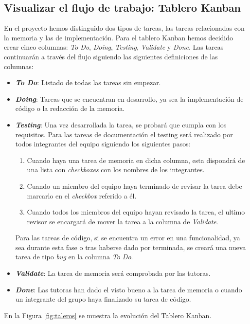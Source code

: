 \subsection{Visualizar el flujo de trabajo: Tablero Kanban}\label{sec:flujoTrabajo}
En el proyecto hemos distinguido dos tipos de tareas, las tareas relacionadas con la memoria y las de implementación. Para el tablero Kanban hemos decidido crear cinco columnas: \textit{To Do}, \textit{Doing}, \textit{Testing}, \textit{Validate} y \textit{Done}.  Las tareas continuarán a través del flujo siguiendo las siguientes definiciones de las columnas:
\begin{itemize}
    \item \textbf{\textit{To Do}}: Listado de todas las tareas sin empezar.
    \item \textbf{\textit{Doing}}: Tareas que se encuentran en desarrollo, ya sea la implementación de código o la redacción de la memoria.
    \item \textbf{\textit{Testing}}: Una vez desarrollada la tarea, se probará que cumpla con los requisitos.
          Para las tareas de documentación el testing será realizado por todos integrantes del equipo siguiendo los siguientes pasos:
          \begin{enumerate}
              \item Cuando haya una tarea de memoria en dicha columna, esta dispondrá de una lista con \textit{checkboxes} con los nombres de los integrantes.
              \item Cuando un miembro del equipo haya terminado de revisar la tarea debe marcarlo en el \textit{checkbox} referido a él.
              \item Cuando todos los miembros del equipo hayan revisado la tarea, el ultimo revisor se encargará de mover la tarea a la columna de \textit{Validate}.
          \end{enumerate}
          Para las tareas de código, si se encuentra un error en una funcionalidad, ya sea durante esta fase o tras haberse dado por terminada, se creará una nueva tarea de tipo \textit{bug} en la columna \textit{To Do}.
    \item \textbf{\textit{Validate}}: La tarea de memoria será comprobada por las tutoras.
    \item \textbf{\textit{Done}}: Las tutoras han dado el visto bueno a la tarea de memoria o cuando un integrante del grupo haya finalizado su tarea de código.
\end{itemize}
En la Figura \ref{fig:taleros} se muestra la evolución del Tablero Kanban.
